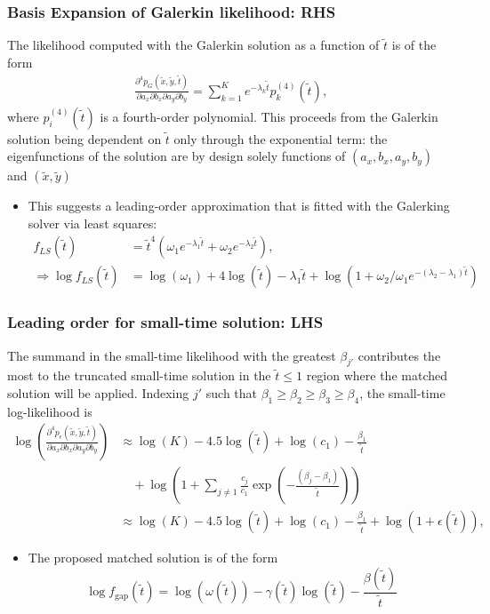 \documentclass{beamer}
\begin{document}
\begin{frame}
  \frametitle{Basis Expansion of Galerkin likelihood: RHS}
  The likelihood computed with the Galerkin solution as a
function of $\tilde{t}$ is of the form
\begin{align*}
  \frac{\partial^4 p_{G}(\tilde{x}, \tilde{y}, \tilde{t})}{\partial a_x
  \partial b_x \partial a_y \partial b_y} = \sum_{k=1}^{K} e^{-\lambda_k\tilde{t}} p_k^{(4)}(\tilde{t}),
\end{align*}
where $p_i^{(4)}(\tilde{t})$ is a fourth-order polynomial. This
proceeds from the Galerkin solution being dependent on $\tilde{t}$
only through the exponential term: the eigenfunctions of the solution
are by design solely functions of $(a_x, b_x, a_y, b_y)$ and
$(\tilde{x}, \tilde{y})$


\begin{itemize}
\item This suggests a leading-order approximation that is fitted with the Galerking solver via least squares:
  \begin{align*}
     f_{LS}(\tilde{t}) &= \tilde{t}^4 \left( \omega_1 e^{-\lambda_1\tilde{t}} + \omega_2 e^{-\lambda_2\tilde{t}}\right), \\
    \Rightarrow \log f_{LS}(\tilde{t}) &= \log(\omega_1) + 4 \log(\tilde{t}) -\lambda_1\tilde{t} + \log\left(1 + \omega_2/\omega_1 e^{-(\lambda_2-\lambda_1)\tilde{t}} \right)
  \end{align*}
\end{itemize}
\end{frame}
\begin{frame}
  \frametitle{Leading order for small-time solution: LHS}

  The summand in the small-time likelihood with the greatest
  $\beta_{j'}$ contributes the most to the truncated small-time
  solution in the $\tilde{t} \leq 1$ region where the matched solution
  will be applied. Indexing $j'$ such that
  $\beta_1 \geq \beta_2 \geq \beta_3 \geq \beta_4$, the small-time
  log-likelihood is
\begin{align*}
  \log\left( \frac{\partial^4 p_\epsilon(\tilde{x}, \tilde{y}, \tilde{t})}{\partial a_x
  \partial b_x \partial a_y \partial b_y} \right) &\approx \log(K) - 4.5\log(\tilde{t}) + \log(c_1) - \frac{\beta_1}{\tilde{t}} \nonumber \\
  &\quad + \log\left(1 + \sum_{j \neq 1} \frac{c_j}{c_1}\exp\left( -\frac{(\beta_j-\beta_1)}{\tilde{t}} \right) \right) \nonumber \\
  &\approx \log(K) - 4.5\log(\tilde{t}) + \log(c_1) - \frac{\beta_1}{\tilde{t}} + \log\left(1 + \epsilon(\tilde{t}) \right), 
\end{align*}

  \begin{itemize}
\item The proposed matched solution is of the form
  \[
    \log f_{\mbox{gap}}(\tilde{t}) = \log(\omega(\tilde{t})) -
    \gamma(\tilde{t})\log(\tilde{t}) -
    \frac{\beta(\tilde{t})}{\tilde{t}}
  \]
  \end{itemize}
\end{frame}
\end{document}
